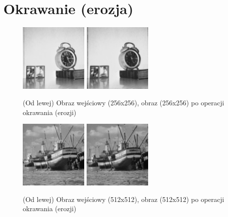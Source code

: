 \documentclass[final,a4paper,openany,12pt]{mwbk}
\begin{document}
\section{ Okrawanie (erozja)}

\begin{figure}[H]
	\begin{center}
		\includegraphics[width=0.3\textwidth]{1/1Gray_E_Original}
		\includegraphics[width=0.3\textwidth]{1/1Gray_E_Result}
	\end{center}
	\caption{(Od lewej) Obraz wejściowy (256x256), obraz (256x256) po operacji okrawania (erozji) }
\end{figure}

\begin{figure}[H]
	\begin{center}
		\includegraphics[width=0.3\textwidth]{2/2Gray_E_Original}
		\includegraphics[width=0.3\textwidth]{2/2Gray_E_Result}
	\end{center}
	\caption{(Od lewej) Obraz wejściowy (512x512), obraz (512x512) po operacji okrawania (erozji) }
\end{figure}
\end{document}
